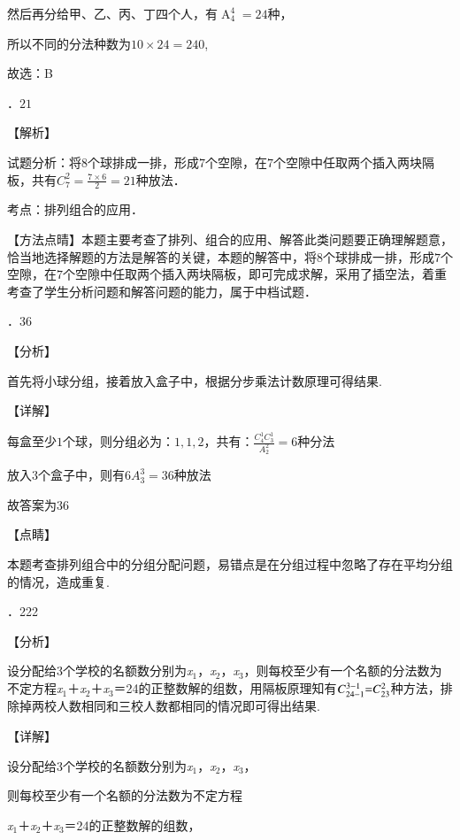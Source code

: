 \documentclass[a4paper,11pt,UTF8,twoside]{ctexart} %
\begin{document}
\noindent 然后再分给甲、乙、丙、丁四个人，有$\mathop{A}\nolimits_{4}^{4} =24$种，

\noindent 所以不同的分法种数为$10\times 24=240$,

\noindent 故选：B

．$21$

\noindent 【解析】

\noindent 试题分析：将$8$个球排成一排，形成$7$个空隙，在$7$个空隙中任取两个插入两块隔板，共有$C_{7}^{2} =\frac{7\times 6}{2} =21$种放法．

\noindent 考点：排列组合的应用．

\noindent 【方法点晴】本题主要考查了排列、组合的应用、解答此类问题要正确理解题意，恰当地选择解题的方法是解答的关键，本题的解答中，将$8$个球排成一排，形成$7$个空隙，在$7$个空隙中任取两个插入两块隔板，即可完成求解，采用了插空法，着重考查了学生分析问题和解答问题的能力，属于中档试题．

．36

\noindent 【分析】

\noindent 首先将小球分组，接着放入盒子中，根据分步乘法计数原理可得结果.

\noindent 【详解】

\noindent 每盒至少$1$个球，则分组必为：$1,1,2$，共有：$\frac{C_{4}^{1} C_{3}^{1} }{A_{2}^{2} } =6$种分法

\noindent 放入$3$个盒子中，则有$6A_{3}^{3} =36$种放法

\noindent 故答案为$36$

\noindent 【点睛】

\noindent 本题考查排列组合中的分组分配问题，易错点是在分组过程中忽略了存在平均分组的情况，造成重复.

．222

\noindent 【分析】

\noindent 设分配给3个学校的名额数分别为\textit{x}${}_{1}$，\textit{x}${}_{2}$，\textit{x}${}_{3}$，则每校至少有一个名额的分法数为不定方程\textit{x}${}_{1}$＋\textit{x}${}_{2}$＋\textit{x}${}_{3}$＝24的正整数解的组数，用隔板原理知有$C_{24-1}^{3{\rm -}1} {\rm =}C_{23}^{2} $种方法，排除掉两校人数相同和三校人数都相同的情况即可得出结果.

\noindent 【详解】

\noindent 设分配给3个学校的名额数分别为\textit{x}${}_{1}$，\textit{x}${}_{2}$，\textit{x}${}_{3}$，

\noindent 则每校至少有一个名额的分法数为不定方程

\noindent \textit{x}${}_{1}$＋\textit{x}${}_{2}$＋\textit{x}${}_{3}$＝24的正整数解的组数，
\end{document}
